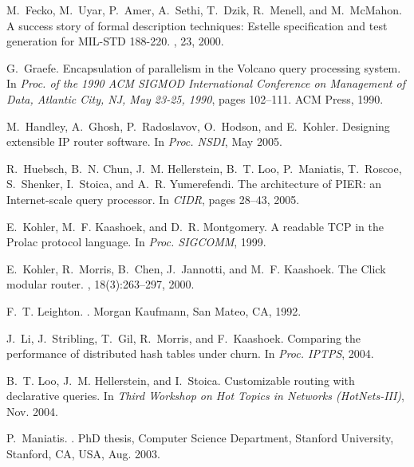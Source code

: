 \begin{thebibliography}{10}
M.~Fecko, M.~Uyar, P.~Amer, A.~Sethi, T.~Dzik, R.~Menell, and M.~McMahon.
\newblock A success story of formal description techniques: Estelle
  specification and test generation for {MIL-STD 188-220}.
,
  23, 2000.

G.~Graefe.
\newblock Encapsulation of parallelism in the {V}olcano query processing
  system.
\newblock In {\em Proc. of the 1990 ACM SIGMOD International Conference on
  Management of Data, Atlantic City, NJ, May 23-25, 1990}, pages 102--111. ACM
  Press, 1990.

M.~Handley, A.~Ghosh, P.~Radoslavov, O.~Hodson, and E.~Kohler.
\newblock Designing extensible {IP} router software.
\newblock In {\em Proc. NSDI}, May 2005.

R.~Huebsch, B.~N. Chun, J.~M. Hellerstein, B.~T. Loo, P.~Maniatis, T.~Roscoe,
  S.~Shenker, I.~Stoica, and A.~R. Yumerefendi.
\newblock The architecture of {PIER}: an {I}nternet-scale query processor.
\newblock In {\em CIDR}, pages 28--43, 2005.

E.~Kohler, M.~F. Kaashoek, and D.~R. Montgomery.
\newblock A readable {TCP} in the {P}rolac protocol language.
\newblock In {\em Proc. SIGCOMM}, 1999.

E.~Kohler, R.~Morris, B.~Chen, J.~Jannotti, and M.~F. Kaashoek.
\newblock The {C}lick modular router.
, 18(3):263--297, 2000.

F.~T. Leighton.
.
\newblock Morgan Kaufmann, San Mateo, CA, 1992.

J.~Li, J.~Stribling, T.~Gil, R.~Morris, and F.~Kaashoek.
\newblock Comparing the performance of distributed hash tables under churn.
\newblock In {\em Proc. IPTPS}, 2004.

B.~T. Loo, J.~M. Hellerstein, and I.~Stoica.
\newblock Customizable routing with declarative queries.
\newblock In {\em Third Workshop on Hot Topics in Networks (HotNets-III)}, Nov.
  2004.

P.~Maniatis.
.
\newblock PhD thesis, Computer Science Department, Stanford University,
  Stanford, {CA}, {USA}, Aug. 2003.


\end{thebibliography}
